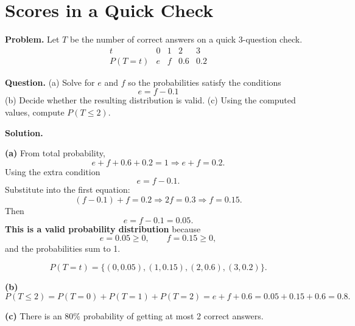 		
		
		\section{Scores in a Quick Check}
			\textbf{Problem.}
		Let $T$ be the number of correct answers on a quick 3-question check.
		\[
		\begin{array}{c|cccc}
			t & 0 & 1 & 2 & 3\\
			\hline
			P(T=t) & e & f & 0.6 & 0.2
		\end{array}
		\]
		
		\textbf{Question.}
		(a) Solve for $e$ and $f$ so the probabilities satisfy the conditions
		\[ e=f-0.1		\]
		(b) Decide whether the resulting distribution is valid.
		(c) Using the computed values, compute $P(T\le 2)$.
		
		\textbf{Solution.}

		\textbf{(a)} From total probability,
		\[
		e+f+0.6+0.2=1\Rightarrow e+f=0.2.
		\]
		Using the extra condition
		\[
		e=f-0.1.
		\]
		Substitute into the first equation:
		\[
		(f-0.1)+f=0.2\Rightarrow 2f=0.3\Rightarrow f=0.15.
		\]
		Then
		\[
		e=f-0.1=0.05.
		\]
		\textbf{This is a valid probability distribution} because
		\[
		e=0.05\ge 0,\qquad f=0.15\ge 0,
		\]
		and the probabilities sum to 1.

		
\[
		P(T=t)=\{(0,0.05),(1,0.15),(2,0.6),(3,0.2)\}.
		\]
\begin{center}
		\end{center}
\textbf{(b)}
		\[
		P(T\le 2)=P(T=0)+P(T=1)+P(T=2)=e+f+0.6=0.05+0.15+0.6=0.8.
		\]
		\begin{center}
		\end{center}
		\textbf{(c)} There is an $80\%$ probability of getting at most 2 correct answers.
		
